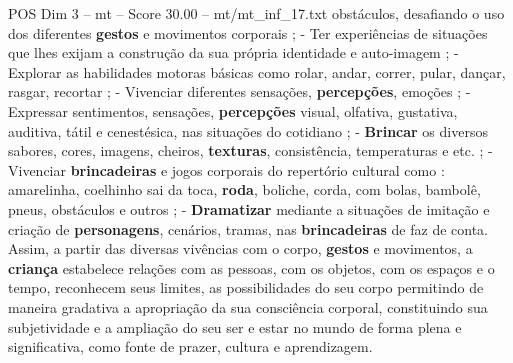 \begin{textsample}{POS Dim 3 – mt – Score 30.00 – mt/mt\_inf\_17.txt}
obstáculos, desafiando o uso dos diferentes \textbf{gestos} e movimentos corporais ; - Ter experiências de situações que lhes exijam a construção da sua própria identidade e auto-imagem ; - Explorar as habilidades motoras básicas como rolar, andar, correr, pular, dançar, rasgar, recortar ; - Vivenciar diferentes sensações, \textbf{percepções}, emoções ; - Expressar sentimentos, sensações, \textbf{percepções} visual, olfativa, gustativa, auditiva, tátil e cenestésica, nas situações do cotidiano ; - \textbf{Brincar} os diversos sabores, cores, imagens, cheiros, \textbf{texturas}, consistência, temperaturas e etc. ; - Vivenciar \textbf{brincadeiras} e jogos corporais do repertório cultural como : amarelinha, coelhinho sai da toca, \textbf{roda}, boliche, corda, com bolas, bambolê, pneus, obstáculos e outros ; - \textbf{Dramatizar} mediante a situações de imitação e criação de \textbf{personagens}, cenários, tramas, nas \textbf{brincadeiras} de faz de conta.
Assim, a partir das diversas vivências com o corpo, \textbf{gestos} e movimentos, a \textbf{criança} estabelece relações com as pessoas, com os objetos, com os espaços e o tempo, reconhecem seus limites, as possibilidades do seu corpo permitindo de maneira gradativa a apropriação da sua consciência corporal, constituindo sua subjetividade e a ampliação do seu ser e estar no mundo de forma plena e significativa, como fonte de prazer, cultura e aprendizagem.

\end{textsample}
